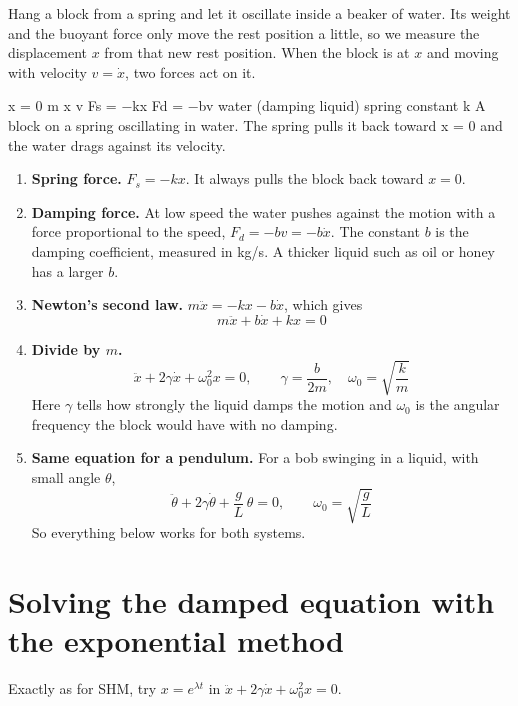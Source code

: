  
Hang a block from a spring and let it oscillate inside a beaker of water. Its weight and the buoyant force only move the rest position a little, so we measure the displacement $x$ from that new rest position. When the block is at $x$ and moving with velocity $v=\dot x$, two forces act on it.

          x = 0  m   x  v  Fs = −kx  Fd = −bv water (damping liquid) spring constant k  A block on a spring oscillating in water. The spring pulls it back toward x = 0 and the water drags against its velocity. 
\begin{enumerate}
\item \textbf{Spring force.} $F_s=-kx$. It always pulls the block back toward $x=0$.
\item \textbf{Damping force.} At low speed the water pushes against the motion with a force proportional to the speed, $F_d=-bv=-b\dot x$. The constant $b$ is the damping coefficient, measured in kg/s. A thicker liquid such as oil or honey has a larger $b$.
\item \textbf{Newton's second law.} $m\ddot x=-kx-b\dot x$, which gives 
$$m\ddot x+b\dot x+kx=0$$
\item \textbf{Divide by $m$.} 
$$\ddot x+2\gamma\dot x+\omega_0^2x=0,\qquad \gamma=\frac b{2m},\quad \omega_0=\sqrt{\frac km}$$
 Here $\gamma$ tells how strongly the liquid damps the motion and $\omega_0$ is the angular frequency the block would have with no damping.
\item \textbf{Same equation for a pendulum.} For a bob swinging in a liquid, with small angle $\theta$, 
$$\ddot\theta+2\gamma\dot\theta+\frac gL\,\theta=0,\qquad \omega_0=\sqrt{\frac gL}$$
 So everything below works for both systems.
\end{enumerate}

 
\section{Solving the damped equation with the exponential method}

 
Exactly as for SHM, try $x=e^{\lambda t}$ in $\ddot x+2\gamma\dot x+\omega_0^2x=0$.


